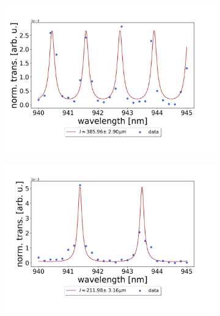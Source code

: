 \begin{figure}[h!]
    \centering
    \begin{subfigure}[b]{0.49\textwidth}
        \includegraphics[width=\textwidth]{figures/results/single fano fits/380um_off_res_fabry_perot.png}
        \caption{}
        \label{fig:380um_off_res_fabry_perot}
    \end{subfigure}
    \begin{subfigure}[b]{0.49\textwidth}
        \includegraphics[width=\textwidth]{figures/results/single fano fits/220um_off_res_fabry_perot.png}
        \caption{}
        \label{fig:220um_off_res_fabry_perot}
    \end{subfigure}
    \begin{subfigure}[b]{0.49\textwidth}

\end{subfigure}
\end{figure}
